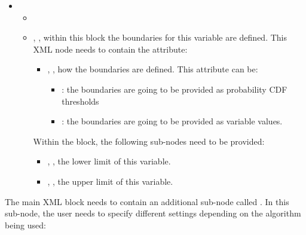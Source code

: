 \begin{itemize}
\item \variableDescription
 \variableChildrenIntro
 \begin{itemize}
    \item \distributionDescription
     \item {}, , within this
       block the boundaries for this variable are defined.
       This XML node needs to contain the attribute:
       \begin{itemize}
         \item {}, , how the
           boundaries are defined.
           This attribute can be:
           \begin{itemize}
             \item {}: the boundaries are going to be provided as
               probability CDF thresholds
             \item {}: the boundaries are going to be provided as
               variable values.
           \end{itemize}
       \end{itemize}
       Within the  block, the following sub-nodes need to be
       provided:
       \begin{itemize}
         \item {}, , the lower limit
           of this variable.
         \item {}, , the upper limit
           of this variable.
       \end{itemize}
 \end{itemize}
\end{itemize}
The main XML block  needs to contain an
additional sub-node called . 
In this sub-node, the user needs to specify different settings depending on the
algorithm being used:
